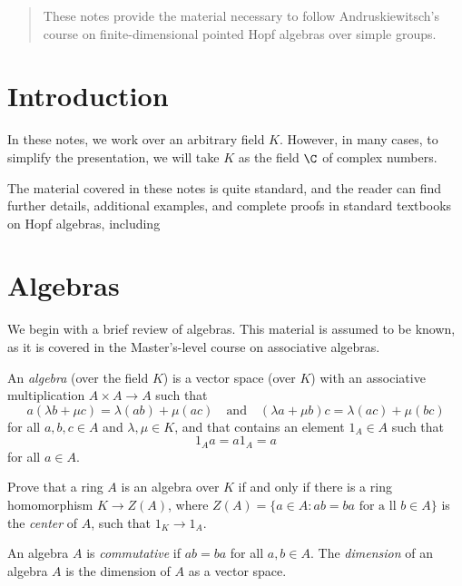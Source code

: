 \documentclass[12pt]{amsproc}
\begin{document}
\begin{abstract}
These notes provide the material necessary to follow Andruskiewitsch’s course on finite-dimensional pointed Hopf algebras over simple groups.
\end{abstract}

\maketitle

\section{Introduction}

In these notes, we work over an arbitrary field $K$. 
However, in many cases, to simplify the presentation, 
we will take $K$ as the field $\C$ of complex numbers. 


The material covered in these notes is quite standard, and the reader can find further details, additional examples, and complete proofs in standard textbooks on Hopf algebras, including~\cite{zbMATH03747352,zbMATH07679315,zbMATH00482792,zbMATH03309240}

\section{Algebras}

We begin with a brief review of algebras.
This material is assumed to be known, as it is covered in the Master's-level course on associative algebras.

An \emph{algebra} (over the field $K$) is a vector space (over $K$)
with an associative multiplication $A\times A\to A$ such that
\[
a(\lambda b+\mu c)=\lambda(ab)+\mu(ac)\quad\text{and}\quad
(\lambda a+\mu b)c=\lambda(ac)+\mu (bc)
 \]
for all $a,b,c\in A$ and $\lambda,\mu\in K$, and
that contains an element $1_A\in A$ such that
 \[
 1_Aa=a1_A=a
 \]
 for all $a\in A$.

\begin{exercise}
\label{xca:center}
Prove that a ring $A$ is an algebra over $K$
if and only if
there is a ring homomorphism $K\to Z(A)$, where $Z(A)=\{a\in A:ab=ba\text{ for a
ll $b\in A$}\}$ is the \emph{center}
of $A$,
such that $1_K\to 1_A$.
\end{exercise}

An algebra $A$ is \emph{commutative} if $ab=ba$ for all $a,b\in A$.
The \emph{dimension} of an algebra $A$ is the dimension of $A$ as a vector space. 
\end{document}
